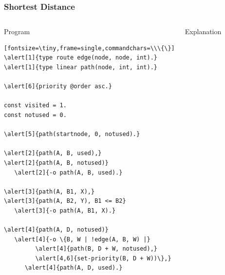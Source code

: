 \documentclass{beamer}
\let\oldalert\alert
\renewcommand{\alert}[2][]{%
  \if\relax\detokenize{#1}\relax%
    \oldalert{#2}%
  \else
    \oldalert<#1>{#2}%
  \fi}
\begin{document}
\begin{frame}[fragile]
   \frametitle{Shortest Distance}
   \begin{columns}[t]
       \begin{block}{Program}
         \begin{verbatim}[fontsize=\tiny,frame=single,commandchars=\\\{\}]
\alert[1]{type route edge(node, node, int).}
\alert[1]{type linear path(node, int, int).}

\alert[6]{priority @order asc.}

const visited = 1.
const notused = 0.

\alert[5]{path(startnode, 0, notused).}

\alert[2]{path(A, B, used),}
\alert[2]{path(A, B, notused)}
   \alert[2]{-o path(A, B, used).}

\alert[3]{path(A, B1, X),}
\alert[3]{path(A, B2, Y), B1 <= B2}
   \alert[3]{-o path(A, B1, X).}

\alert[4]{path(A, D, notused)}
   \alert[4]{-o \{B, W | !edge(A, B, W) |}
         \alert[4]{path(B, D + W, notused),}
         \alert[4,6]{set-priority(B, D + W))\},}
      \alert[4]{path(A, D, used).}
         \end{verbatim}
      \end{block}
      \begin{block}{Explanation}
         {\small
         \begin{itemize}
         \end{itemize}
         }
      \end{block}
   \end{columns}
\end{frame}
\end{document}
